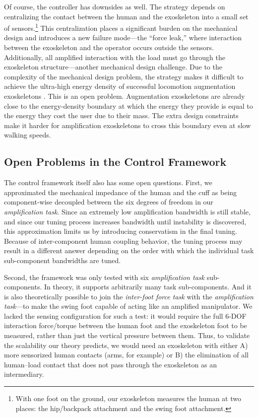 \documentclass[utf8]{frontiersSCNS}
\renewcommand*{\cite}[1]{\citep{#1}}
\begin{document}
Of course, the controller has downsides as well.
The strategy depends on centralizing the contact between the human and the exoskeleton into a small set of sensors.\footnote{With one foot on the ground, our exoskeleton measures the human at two places: the hip/backpack attachment and the swing foot attachment.}
This centralization places a significant burden on the mechanical design and introduces a new failure mode---the ``force leak,'' where interaction between the exoskeleton and the operator occurs outside the sensors.
Additionally, all amplified interaction with the load must go through the exoskeleton structure---another mechanical design challenge.
Due to the complexity of the mechanical design problem, the strategy makes it difficult to achieve the ultra-high energy density of successful locomotion augmentation exoskeletons \cite{KimWalshEA2019Science,MooneyRouseHerr2014JNRE}.
This is an open problem.
Augmentation exoskeletons are already close to the energy-density boundary at which the energy they provide is equal to the energy they cost the user due to their mass.
The extra design constraints make it harder for amplification exoskeletons to cross this boundary even at slow walking speeds.



\subsection{Open Problems in the Control Framework}
\label{subs:open_control}
The control framework itself also has some open questions.
First, we approximated the mechanical impedance of the human and the cuff as being component-wise decoupled between the six degrees of freedom in our \emph{amplification task}.
Since an extremely low amplification bandwidth is still stable, and since our tuning process increases bandwidth until instability is discovered, this approximation limits us by introducing conservatism in the final tuning. %
Because of inter-component human coupling behavior, the tuning process may result in a different answer depending on the order with which the individual task sub-component bandwidths are tuned. %



Second, the framework was only tested with six \emph{amplification task} sub-components.
In theory, it supports arbitrarily many task sub-components.
And it is also theoretically possible to join the \emph{inter-foot force task} with the \emph{amplification task}---to make the swing foot capable of acting like an amplified manipulator.
We lacked the sensing configuration for such a test: it would require the full 6-DOF interaction force/torque between the human foot and the exoskeleton foot to be measured, rather than just the vertical pressure between them.
Thus, to validate the scalability our theory predicts, we would need an exoskeleton with either A) more sensorized human contacts (arms, for example) or B) the elimination of all human--load contact that does not pass through the exoskeleton as an intermediary.
\end{document}
